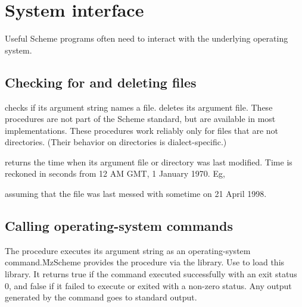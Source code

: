 \chapter{System interface}
\label{os}

Useful Scheme programs often need to interact with the
underlying operating system. 


\section{Checking for and deleting files}

 checks if its argument string names
a file.   deletes its argument file.
These procedures are not part of the Scheme standard,
but are available in most implementations.  These
procedures work reliably only for files that are not
directories.  (Their behavior on directories is
dialect-specific.) 


 returns the time when its 
argument file or directory was last modified.  Time is
reckoned in seconds from 12 AM GMT, 1 January 1970.
Eg,


\n assuming that the file  was last messed with 
sometime on 21 April 1998.

\section{Calling operating-system commands}

The  procedure executes its argument string
as an operating-system command.\f{MzScheme provides the
 procedure via the  library.  Use  to load this library.}   It returns true if the
command executed successfully with an exit status 0,
and false if it failed to execute or exited with a
non-zero status.  Any output generated by the command
goes to standard output.

